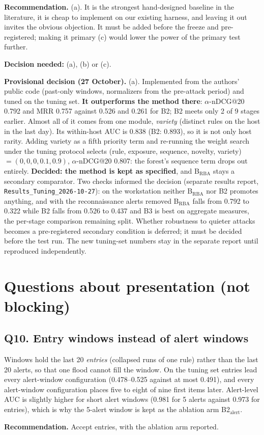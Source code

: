 \documentclass[10.5pt,a4paper]{article}
\newcommand{\rec}[1]{\par\smallskip\noindent\colorbox{gray!12}{\parbox{\dimexpr\linewidth-2\fboxsep}{\textbf{Recommendation.} #1}}\par\smallskip}
\newcommand{\ask}[1]{\par\noindent\textbf{Decision needed:} #1\par\medskip}
\newcommand{\dec}[1]{\par\smallskip\noindent\colorbox{blue!8}{\parbox{\dimexpr\linewidth-2\fboxsep}{\textbf{Provisional decision (27 October).} #1}}\par\medskip}
\begin{document}
\rec{(a). It is the strongest hand-designed baseline in the literature, it is cheap to implement on our existing harness, and leaving it out invites the obvious objection. It must be added before the freeze and pre-registered; making it primary (c) would lower the power of the primary test further.}
\ask{(a), (b) or (c).}
\dec{(a). Implemented from the authors' public code (past-only windows, normalizers from the pre-attack period) and tuned on the tuning set. \textbf{It outperforms the method there}: $\alpha$-nDCG@20 0.792 and MRR 0.757 against 0.526 and 0.261 for B2; B2 meets only 2 of 9 stages earlier. Almost all of it comes from one module, \emph{variety} (distinct rules on the host in the last day). Its within-host AUC is 0.838 (B2: 0.893), so it is not only host rarity. Adding variety as a fifth priority term and re-running the weight search under the tuning protocol selects (rule, exposure, sequence, novelty, variety) $= (0, 0, 0, 0.1, 0.9)$, $\alpha$-nDCG@20 0.807: the forest's sequence term drops out entirely. \textbf{Decided: the method is kept as specified}, and B$_\mathrm{RBA}$ stays a secondary comparator. Two checks informed the decision (separate results report, \texttt{Results\_Tuning\_2026-10-27}): on the workstation neither B$_\mathrm{RBA}$ nor B2 promotes anything, and with the reconnaissance alerts removed B$_\mathrm{RBA}$ falls from 0.792 to 0.322 while B2 falls from 0.526 to 0.437 and B3 is best on aggregate measures, the per-stage comparison remaining split. Whether robustness to quieter attacks becomes a pre-registered secondary condition is deferred; it must be decided before the test run. The new tuning-set numbers stay in the separate report until reproduced independently.}

\section{Questions about presentation (not blocking)}
\label{sec:presentation}

\subsection*{Q10. Entry windows instead of alert windows}
Windows hold the last 20 \emph{entries} (collapsed runs of one rule) rather than the last 20 alerts, so that one flood cannot fill the window. On the tuning set entries lead every alert-window configuration (0.478--0.525 against at most 0.491), and every alert-window configuration places five to eight of nine first items later. Alert-level AUC is slightly higher for short alert windows (0.981 for 5 alerts against 0.973 for entries), which is why the 5-alert window is kept as the ablation arm B2$_\mathrm{alert}$.
\rec{Accept entries, with the ablation arm reported.}
\end{document}
